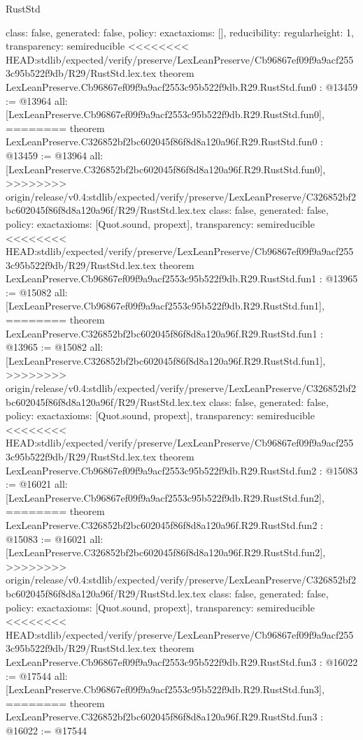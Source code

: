 \begin{lexlean}{RustStd}
\begin{coremodule}
{\begin{coremodule}
{{{  class: false,
  generated: false,
  policy: exact{axioms: []},
  reducibility: regular{height: 1},
  transparency: semireducible
}
<<<<<<<< HEAD:stdlib/expected/verify/preserve/LexLeanPreserve/Cb96867ef09f9a9acf2553c95b522f9db/R29/RustStd.lex.tex
theorem LexLeanPreserve.Cb96867ef09f9a9acf2553c95b522f9db.R29.RustStd.fun0 : @13459 := @13964 {
  all: [LexLeanPreserve.Cb96867ef09f9a9acf2553c95b522f9db.R29.RustStd.fun0],
========
theorem LexLeanPreserve.C326852bf2bc602045f86f8d8a120a96f.R29.RustStd.fun0 : @13459 := @13964 {
  all: [LexLeanPreserve.C326852bf2bc602045f86f8d8a120a96f.R29.RustStd.fun0],
>>>>>>>> origin/release/v0.4:stdlib/expected/verify/preserve/LexLeanPreserve/C326852bf2bc602045f86f8d8a120a96f/R29/RustStd.lex.tex
  class: false,
  generated: false,
  policy: exact{axioms: [Quot.sound, propext]},
  transparency: semireducible
}
<<<<<<<< HEAD:stdlib/expected/verify/preserve/LexLeanPreserve/Cb96867ef09f9a9acf2553c95b522f9db/R29/RustStd.lex.tex
theorem LexLeanPreserve.Cb96867ef09f9a9acf2553c95b522f9db.R29.RustStd.fun1 : @13965 := @15082 {
  all: [LexLeanPreserve.Cb96867ef09f9a9acf2553c95b522f9db.R29.RustStd.fun1],
========
theorem LexLeanPreserve.C326852bf2bc602045f86f8d8a120a96f.R29.RustStd.fun1 : @13965 := @15082 {
  all: [LexLeanPreserve.C326852bf2bc602045f86f8d8a120a96f.R29.RustStd.fun1],
>>>>>>>> origin/release/v0.4:stdlib/expected/verify/preserve/LexLeanPreserve/C326852bf2bc602045f86f8d8a120a96f/R29/RustStd.lex.tex
  class: false,
  generated: false,
  policy: exact{axioms: [Quot.sound, propext]},
  transparency: semireducible
}
<<<<<<<< HEAD:stdlib/expected/verify/preserve/LexLeanPreserve/Cb96867ef09f9a9acf2553c95b522f9db/R29/RustStd.lex.tex
theorem LexLeanPreserve.Cb96867ef09f9a9acf2553c95b522f9db.R29.RustStd.fun2 : @15083 := @16021 {
  all: [LexLeanPreserve.Cb96867ef09f9a9acf2553c95b522f9db.R29.RustStd.fun2],
========
theorem LexLeanPreserve.C326852bf2bc602045f86f8d8a120a96f.R29.RustStd.fun2 : @15083 := @16021 {
  all: [LexLeanPreserve.C326852bf2bc602045f86f8d8a120a96f.R29.RustStd.fun2],
>>>>>>>> origin/release/v0.4:stdlib/expected/verify/preserve/LexLeanPreserve/C326852bf2bc602045f86f8d8a120a96f/R29/RustStd.lex.tex
  class: false,
  generated: false,
  policy: exact{axioms: [Quot.sound, propext]},
  transparency: semireducible
}
<<<<<<<< HEAD:stdlib/expected/verify/preserve/LexLeanPreserve/Cb96867ef09f9a9acf2553c95b522f9db/R29/RustStd.lex.tex
theorem LexLeanPreserve.Cb96867ef09f9a9acf2553c95b522f9db.R29.RustStd.fun3 : @16022 := @17544 {
  all: [LexLeanPreserve.Cb96867ef09f9a9acf2553c95b522f9db.R29.RustStd.fun3],
========
theorem LexLeanPreserve.C326852bf2bc602045f86f8d8a120a96f.R29.RustStd.fun3 : @16022 := @17544 {
}}}}}}}
\end{coremodule}}
\end{coremodule}
\end{lexlean}
